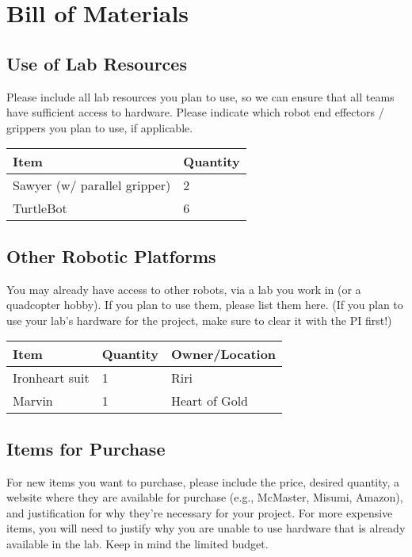 \documentclass[letterpaper]{article}
\begin{document}
\section{Bill of Materials}

\subsection{Use of Lab Resources}

Please include all lab resources you plan to use, so we can ensure that all teams have sufficient access to hardware. Please indicate which robot end effectors / grippers you plan to use, if applicable.

\vspace{1em}

\begin{tabular}[h]{l|l}
\textbf{Item} & \textbf{Quantity} \\
\hline
Sawyer (w/ parallel gripper) & 2 \\
TurtleBot & 6 \\ %
\end{tabular}

\subsection{Other Robotic Platforms}

You may already have access to other robots, via a lab you work in (or a quadcopter hobby). If you plan to use them, please list them here. (If you plan to use your lab's hardware for the project, make sure to clear it with the PI first!)

\vspace{1em}

\begin{tabular}[h]{l|l|l}
\textbf{Item} & \textbf{Quantity} & \textbf{Owner/Location} \\
\hline
Ironheart suit & 1 & Riri \\
Marvin & 1 & Heart of Gold\\ 
\end{tabular}

\subsection{Items for Purchase}

For new items you want to purchase, please include the price, desired quantity, a website where they are available for purchase (e.g., McMaster, Misumi, Amazon), and justification for why they're necessary for your project. For more expensive items, you will need to justify why you are unable to use hardware that is already available in the lab. Keep in mind the limited budget.
\end{document}
